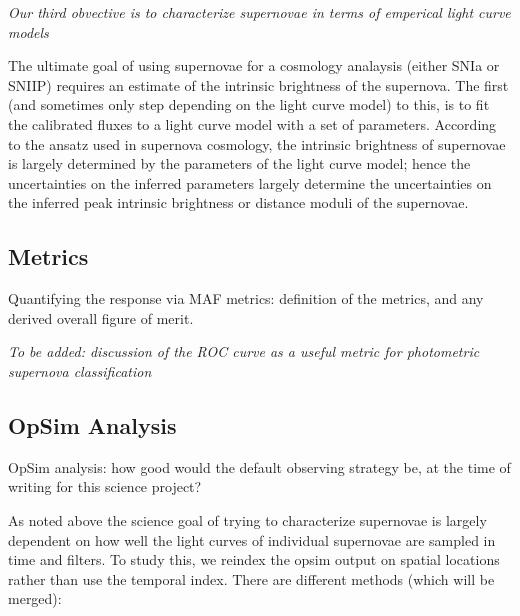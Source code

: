 {\emph{Our third obvective is to characterize supernovae in terms of emperical
    light curve models}}

The ultimate goal of using supernovae for a cosmology analaysis (either SNIa or SNIIP) requires an estimate of the intrinsic brightness of the supernova. The
first (and sometimes only step depending on the light curve model) to this, is
to fit the calibrated fluxes to a light curve model with a set of parameters.
According to the ansatz used in supernova cosmology, the intrinsic brightness of
 supernovae is largely determined by the parameters of the light curve model; 
 hence the uncertainties on the inferred parameters largely determine the
 uncertainties on the inferred peak intrinsic brightness or distance moduli of the supernovae.








\subsection{Metrics}
\label{sec:keyword:metrics}

Quantifying the response via MAF metrics: definition of the metrics,
and any derived overall figure of merit.

\emph{To be added: discussion of the ROC curve as a useful metric for photometric supernova 
classification}


\subsection{OpSim Analysis}
\label{sec:keyword:analysis}

OpSim analysis: how good would the default observing strategy be, at
the time of writing for this science project?

As noted above the science goal of trying to characterize supernovae is largely
dependent on how well the light curves of individual supernovae are sampled in
time and filters. To study this, we reindex the opsim output on spatial
locations rather than use the temporal index. There are different methods (which will be merged): 



